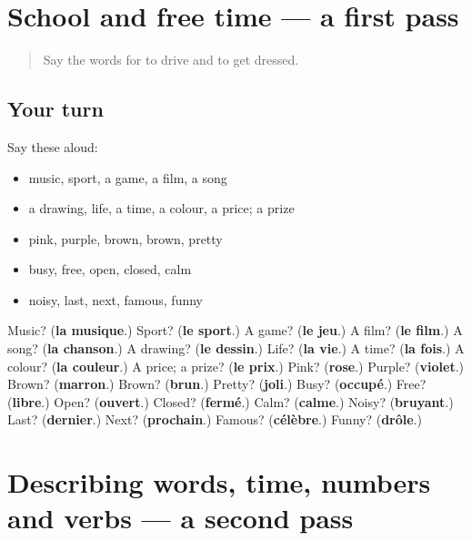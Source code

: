 \section[(dialogue)]{School and free time — a first pass}

\label{lesson:FR-R138-first-pass-school-and-free-time}



\begin{quote}
Say the words for to drive and to get dressed.
\end{quote}

\subsection*{Your turn}
Say these aloud:

\begin{itemize}
\raggedright
  \item music, sport, a game, a film, a song
  \item a drawing, life, a time, a colour, a price; a prize
  \item pink, purple, brown, brown, pretty
  \item busy, free, open, closed, calm
  \item noisy, last, next, famous, funny
\end{itemize}

\begin{tcolorbox}[breakable,colback=teal!4,colframe=teal!35!black,title={Before you move on}]
Music? (\textbf{la musique}.) Sport? (\textbf{le sport}.) A game? (\textbf{le jeu}.) A film? (\textbf{le film}.) A song? (\textbf{la chanson}.) A drawing? (\textbf{le dessin}.) Life? (\textbf{la vie}.) A time? (\textbf{la fois}.) A colour? (\textbf{la couleur}.) A price; a prize? (\textbf{le prix}.) Pink? (\textbf{rose}.) Purple? (\textbf{violet}.) Brown? (\textbf{marron}.) Brown? (\textbf{brun}.) Pretty? (\textbf{joli}.) Busy? (\textbf{occupé}.) Free? (\textbf{libre}.) Open? (\textbf{ouvert}.) Closed? (\textbf{fermé}.) Calm? (\textbf{calme}.) Noisy? (\textbf{bruyant}.) Last? (\textbf{dernier}.) Next? (\textbf{prochain}.) Famous? (\textbf{célèbre}.) Funny? (\textbf{drôle}.)
\end{tcolorbox}
\section[(dialogue)]{Describing words, time, numbers and verbs — a second pass}

\label{lesson:FR-R138-second-pass-describing-words-time-numbers-and-verbs}



